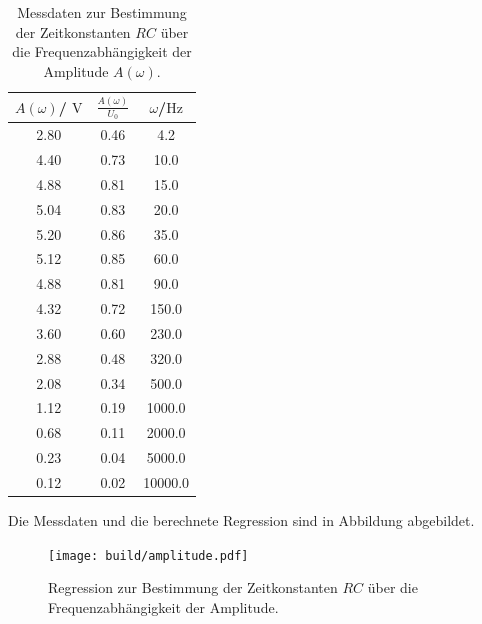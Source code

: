 \begin{table}
	\caption{Messdaten zur Bestimmung der Zeitkonstanten $RC$ über die Frequenzabhängigkeit der Amplitude $A(\omega)$.}
	\label{tab:tab2}
	\centering
	\begin{tabular} {ccc}
		\toprule
		$A(\omega)$/ $\si{\volt}$ & $\frac{A(\omega)}{U_\text{0}}$ & $\omega$/$\si{\Hz}$ \\
		\midrule
		2.80                      & 0.46                           & 4.2                 \\
		4.40                      & 0.73                           & 10.0                \\
		4.88                      & 0.81                           & 15.0                \\
		5.04                      & 0.83                           & 20.0                \\
		5.20                      & 0.86                           & 35.0                \\
		5.12                      & 0.85                           & 60.0                \\
		4.88                      & 0.81                           & 90.0                \\
		4.32                      & 0.72                           & 150.0               \\
		3.60                      & 0.60                           & 230.0               \\
		2.88                      & 0.48                           & 320.0               \\
		2.08                      & 0.34                           & 500.0               \\
		1.12                      & 0.19                           & 1000.0              \\
		0.68                      & 0.11                           & 2000.0              \\
		0.23                      & 0.04                           & 5000.0              \\
		0.12                      & 0.02                           & 10000.0             \\
		\bottomrule
	\end{tabular}
\end{table}

Die Messdaten und die berechnete Regression sind in Abbildung  abgebildet.
\begin{figure}
	\centering
	\texttt{[image: build/amplitude.pdf]}
	\caption{Regression zur Bestimmung der Zeitkonstanten $RC$ über die Frequenzabhängigkeit der Amplitude.}
	\label{fig:plotb}
\end{figure}

